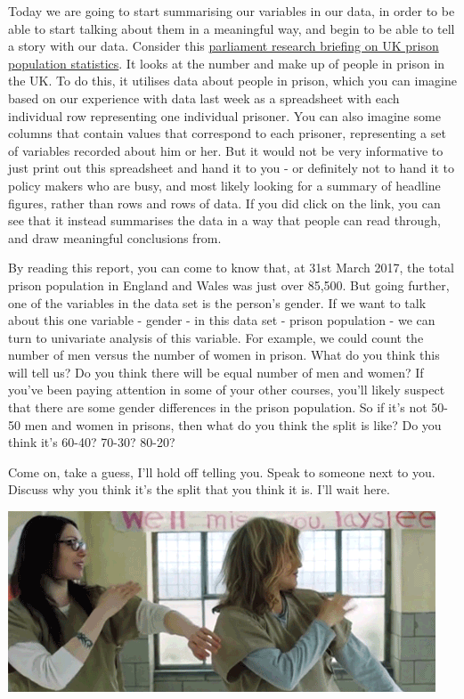 \documentclass[]{book}
\theoremstyle{definition}
\theoremstyle{definition}
\theoremstyle{definition}
\theoremstyle{remark}
\begin{document}
Today we are going to start summarising our variables in our data, in
order to be able to start talking about them in a meaningful way, and
begin to be able to tell a story with our data. Consider this
\href{http://researchbriefings.files.parliament.uk/documents/SN04334/SN04334.pdf}{parliament
research briefing on UK prison population statistics}. It looks at the
number and make up of people in prison in the UK. To do this, it
utilises data about people in prison, which you can imagine based on our
experience with data last week as a spreadsheet with each individual row
representing one individual prisoner. You can also imagine some columns
that contain values that correspond to each prisoner, representing a set
of variables recorded about him or her. But it would not be very
informative to just print out this spreadsheet and hand it to you - or
definitely not to hand it to policy makers who are busy, and most likely
looking for a summary of headline figures, rather than rows and rows of
data. If you did click on the link, you can see that it instead
summarises the data in a way that people can read through, and draw
meaningful conclusions from.

By reading this report, you can come to know that, at 31st March 2017,
the total prison population in England and Wales was just over 85,500.
But going further, one of the variables in the data set is the person's
gender. If we want to talk about this one variable - gender - in this
data set - prison population - we can turn to univariate analysis of
this variable. For example, we could count the number of men versus the
number of women in prison. What do you think this will tell us? Do you
think there will be equal number of men and women? If you've been paying
attention in some of your other courses, you'll likely suspect that
there are some gender differences in the prison population. So if it's
not 50-50 men and women in prisons, then what do you think the split is
like? Do you think it's 60-40? 70-30? 80-20?

Come on, take a guess, I'll hold off telling you. Speak to someone next
to you. Discuss why you think it's the split that you think it is. I'll
wait here.

\includegraphics{imgs/oitnb_dance.gif}
\end{document}
